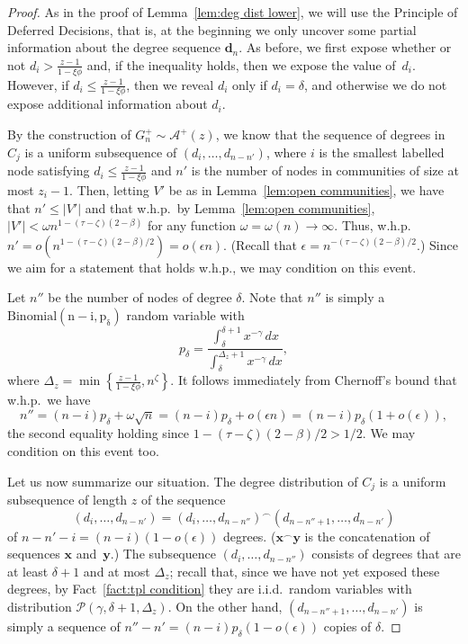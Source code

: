 \documentclass[12pt]{article}
\theoremstyle{definition}
\theoremstyle{remark}
\theoremstyle{remark}
\numberwithin{theorem}{section}
\newcommand{\abcdUpper}{\ensuremath{\mathcal{A}^+(z)}}
\newcommand{\tpl}[3]{\ensuremath{\mathcal{P}\left(#1,#2,#3\right)}}
\begin{document}
\begin{proof}
As in the proof of Lemma~\ref{lem:deg dist lower}, we will use the Principle of Deferred Decisions, that is, at the beginning we only uncover some partial information about the degree sequence $\mathbf{d}_n$. As before, we first expose whether or not $d_i > \frac{z-1}{1-\xi \phi}$ and, if the inequality holds, then we expose the value of~$d_i$. However, if $d_i \le \frac{z-1}{1-\xi \phi}$, then we reveal $d_i$ only if $d_i = \delta$, and otherwise we do not expose additional information about $d_i$. 

By the construction of $G_n^+ \sim \abcdUpper$, we know that the sequence of degrees in $C_j$ is a uniform subsequence of $(d_i,\dots, d_{n-n'})$, where $i$ is the smallest labelled node satisfying $d_i \leq \frac{z-1}{1-\xi \phi}$ and $n'$ is the number of nodes in communities of size at most $z_i-1$. Then, letting $V'$ be as in Lemma~\ref{lem:open communities}, we have that $n' \leq |V'|$ and that  w.h.p.\ by Lemma~\ref{lem:open communities}, $|V'| < \omega n^{1-(\tau-\zeta)(2-\beta)}$ for any function $\omega = \omega(n) \to \infty$. Thus, w.h.p.\ $n' = o \left(n^{1-(\tau-\zeta)(2-\beta)/2}\right) = o(\epsilon n)$. (Recall that $\epsilon = n^{-(\tau-\zeta)(2-\beta)/2}$.) Since we aim for a statement that holds w.h.p., we may condition on this event.

Let $n''$ be the number of nodes of degree $\delta$. Note that $n''$ is simply a $\mathrm{Binomial(n-i,p_\delta)}$ random variable with
$$
p_\delta = \frac{\int_\delta^{\delta+1} x^{-\gamma} \, dx}{\int_\delta^{\Delta_z+1} x^{-\gamma} \, dx},
$$  
where $\Delta_z = \min \left\{ \frac{z-1}{1-\xi \phi} , n^\zeta \right\}$. 
It follows immediately from Chernoff's bound that w.h.p.\ we have 
$$
n'' = (n-i)p_\delta + \omega \sqrt{n} = (n-i)p_\delta + o(\epsilon n) = (n-i)p_\delta (1+o(\epsilon)), 
$$
the second equality holding since $1-(\tau-\zeta)(2-\beta)/2 > 1/2$. We may condition on this event too.

Let us now summarize our situation. The degree distribution of $C_j$ is a uniform subsequence of length $z$ of the sequence
\[
(d_i,\dots,d_{n-n'}) = (d_i,\dots,d_{n-n''}) ^\frown (d_{n-n''+1},\dots,d_{n-n'})
\] 
of $n-n'-i = (n-i)(1-o(\epsilon))$ degrees. ($\textbf{x} ^\frown \textbf{y}$ is the concatenation of sequences $\textbf{x}$ and~$\textbf{y}$.) The subsequence $(d_i,\dots,d_{n-n''})$ consists of degrees that are at least $\delta+1$ and at most $\Delta_z$; recall that, since we have not yet exposed these degrees, by Fact~\ref{fact:tpl condition} they are i.i.d.\ random variables with distribution $\tpl{\gamma}{\delta+1}{\Delta_z}$. On the other hand, $(d_{n-n''+1},\dots,d_{n-n'})$ is simply a sequence of $n''-n' = (n-i)p_\delta (1-o(\epsilon))$ copies of $\delta$.  


\end{proof}
\end{document}
